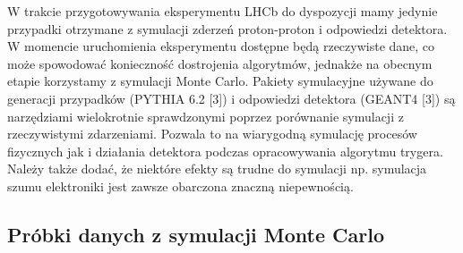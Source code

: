 \documentclass{pracamgr}
\begin{document}
W trakcie przygotowywania eksperymentu LHCb do dyspozycji mamy jedynie przypadki otrzymane z symulacji zderzeń proton-proton i odpowiedzi detektora. W momencie uruchomienia eksperymentu dostępne będą rzeczywiste dane, co może spowodować konieczność dostrojenia algorytmów, jednakże na obecnym etapie korzystamy z symulacji Monte Carlo. Pakiety symulacyjne używane do generacji przypadków (PYTHIA 6.2 [3]) i odpowiedzi detektora (GEANT4 [3]) są narzędziami wielokrotnie sprawdzonymi poprzez porównanie symulacji z rzeczywistymi zdarzeniami. Pozwala to na wiarygodną symulację procesów fizycznych jak i działania detektora podczas opracowywania algorytmu trygera. Należy także dodać, że niektóre efekty są trudne do symulacji np. symulacja szumu elektroniki jest zawsze obarczona znaczną niepewnością.

\subsection{Próbki danych z symulacji Monte Carlo}
\end{document}
